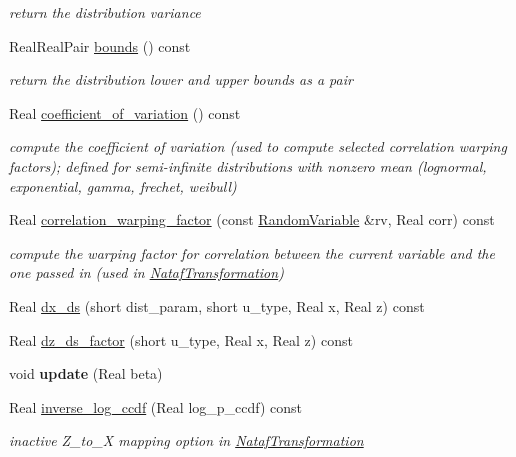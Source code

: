 \begin{DoxyCompactItemize}
\begin{DoxyCompactList}\small\item\em return the distribution variance \end{DoxyCompactList}\item 
Real\+Real\+Pair \hyperlink{classPecos_1_1ExponentialRandomVariable_a4bdb95a8fa5fffaa0de5102f56963cf2}{bounds} () const \label{classPecos_1_1ExponentialRandomVariable_a4bdb95a8fa5fffaa0de5102f56963cf2}

\begin{DoxyCompactList}\small\item\em return the distribution lower and upper bounds as a pair \end{DoxyCompactList}\item 
Real \hyperlink{classPecos_1_1ExponentialRandomVariable_ae1cf1c07047d7ad9dbb899aa01138d54}{coefficient\+\_\+of\+\_\+variation} () const 
\begin{DoxyCompactList}\small\item\em compute the coefficient of variation (used to compute selected correlation warping factors); defined for semi-\/infinite distributions with nonzero mean (lognormal, exponential, gamma, frechet, weibull) \end{DoxyCompactList}\item 
Real \hyperlink{classPecos_1_1ExponentialRandomVariable_a9ee48b3ca93459136b2e73f77873c4aa}{correlation\+\_\+warping\+\_\+factor} (const \hyperlink{classPecos_1_1RandomVariable}{Random\+Variable} \&rv, Real corr) const \label{classPecos_1_1ExponentialRandomVariable_a9ee48b3ca93459136b2e73f77873c4aa}

\begin{DoxyCompactList}\small\item\em compute the warping factor for correlation between the current variable and the one passed in (used in \hyperlink{classPecos_1_1NatafTransformation}{Nataf\+Transformation}) \end{DoxyCompactList}\item 
Real \hyperlink{classPecos_1_1ExponentialRandomVariable_af889af8adfb262c9b74f573b2a9ffc99}{dx\+\_\+ds} (short dist\+\_\+param, short u\+\_\+type, Real x, Real z) const 
\item 
Real \hyperlink{classPecos_1_1ExponentialRandomVariable_af6b5fc528523180bed5fc3008dcea205}{dz\+\_\+ds\+\_\+factor} (short u\+\_\+type, Real x, Real z) const 
\item 
void {\bfseries update} (Real beta)\label{classPecos_1_1ExponentialRandomVariable_a8925d6b1ebeaceb1df4f1652397e0d61}

\item 
Real \hyperlink{classPecos_1_1ExponentialRandomVariable_aa8fe85dfcb1b7cb4357e6d4ec32601b9}{inverse\+\_\+log\+\_\+ccdf} (Real log\+\_\+p\+\_\+ccdf) const \label{classPecos_1_1ExponentialRandomVariable_aa8fe85dfcb1b7cb4357e6d4ec32601b9}

\begin{DoxyCompactList}\small\item\em inactive Z\+\_\+to\+\_\+X mapping option in \hyperlink{classPecos_1_1NatafTransformation}{Nataf\+Transformation} \end{DoxyCompactList}\end{DoxyCompactItemize}
